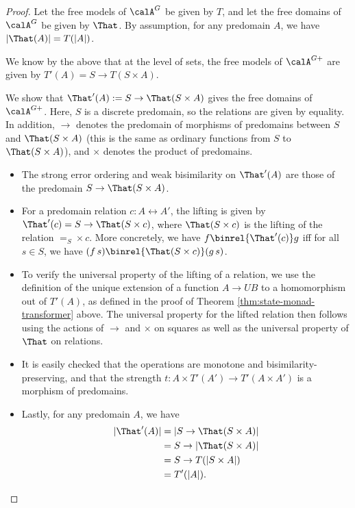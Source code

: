 \begin{proof}
    Let the free models of $\calA^G$ be given by $T$, and let the free domains
    of $\calA^G$ be given by $\That$. By assumption, for any predomain $A$, we
    have $|\That(A)| = T(|A|)$.
    
    We know by the above that at the level of sets, the free models of
    $\calA^{G+}$ are given by $T'(A) = S \to T(S \times A)$.
    
    We show that $\That'(A) := S \to \That(S \times A)$ gives the free domains
    of $\calA^{G+}$. Here, $S$ is a discrete predomain, so the relations are
    given by equality. In addition, $\to$ denotes the predomain of morphisms of
    predomains between $S$ and $\That(S \times A)$ (this is the same as ordinary
    functions from $S$ to $\That(S \times A)$), and $\times$ denotes the product
    of predomains.

    \begin{itemize}
        \item The strong error ordering and weak bisimilarity on $\That'(A)$ are
        those of the predomain $S \to \That(S \times A)$.

        \item For a predomain relation $c : A \rel A'$, the lifting is given by
        $\That'(c) = S \to \That(S \times c)$, where $\That(S \times c)$ is the
        lifting of the relation $=_S \times c$.
        More concretely, we have $f \binrel{\That'(c)} g$ iff for all $s \in S$,
        we have $(f\, s) \binrel{\That(S \times c)} (g\, s)$.

        \item To verify the universal property of the lifting of a relation, we
        use the definition of the unique extension of a function $A \to UB$ to a
        homomorphism out of $T'(A)$, as defined in the proof of Theorem
        \ref{thm:state-monad-transformer} above. The universal property for the
        lifted relation then follows using the actions of $\to$ and $\times$ on
        squares as well as the universal property of $\That$ on relations.

        \item It is easily checked that the operations are monotone and
        bisimilarity-preserving, and that the strength $t : A \times T'(A') \to
        T'(A \times A')$ is a morphism of predomains.
        
        \item Lastly, for any predomain $A$, we have
        \begin{align*}
            |\That'(A)| &= |S \to \That(S \times A)| \\
                        &= S \to |\That(S \times A)| \\
                        &= S \to T(|S \times A|)  \\
                        &= T'(|A|).
        \end{align*}
    \end{itemize}
\end{proof}

